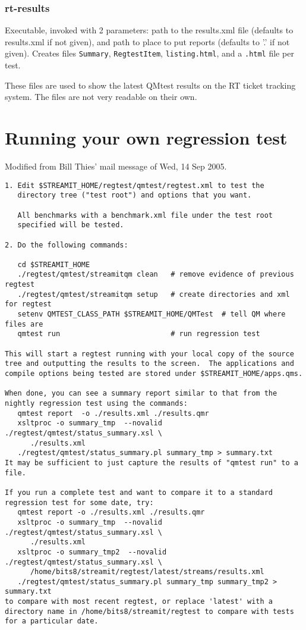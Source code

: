 \documentclass[11pt]{article}
\begin{document}
\subsubsection{rt-results}
Executable, invoked with 2 parameters: path to the results.xml file (defaults
to results.xml if not given), 
and path to place to put reports (defaults to '.' if not given).
Creates files 
{\tt Summary}, 
{\tt RegtestItem}, 
{\tt listing.html},
and a {\tt .html} file per test.

These files are used to show the latest QMtest results on the 
RT ticket tracking system. 
 The files are not very readable on their own.


\section{Running your own regression test}

Modified from Bill Thies' mail message of  Wed, 14 Sep 2005.
\begin{verbatim}
1. Edit $STREAMIT_HOME/regtest/qmtest/regtest.xml to test the
   directory tree ("test root") and options that you want.

   All benchmarks with a benchmark.xml file under the test root
   specified will be tested.

2. Do the following commands:

   cd $STREAMIT_HOME
   ./regtest/qmtest/streamitqm clean   # remove evidence of previous regtest
   ./regtest/qmtest/streamitqm setup   # create directories and xml for regtest
   setenv QMTEST_CLASS_PATH $STREAMIT_HOME/QMTest  # tell QM where files are
   qmtest run                          # run regression test

This will start a regtest running with your local copy of the source
tree and outputting the results to the screen.  The applications and
compile options being tested are stored under $STREAMIT_HOME/apps.qms.

When done, you can see a summary report similar to that from the
nightly regression test using the commands:
   qmtest report  -o ./results.xml ./results.qmr 
   xsltproc -o summary_tmp  --novalid ./regtest/qmtest/status_summary.xsl \
      ./results.xml
   ./regtest/qmtest/status_summary.pl summary_tmp > summary.txt
It may be sufficient to just capture the results of "qmtest run" to a file.

If you run a complete test and want to compare it to a standard
regression test for some date, try:
   qmtest report -o ./results.xml ./results.qmr 
   xsltproc -o summary_tmp  --novalid ./regtest/qmtest/status_summary.xsl \
      ./results.xml
   xsltproc -o summary_tmp2  --novalid ./regtest/qmtest/status_summary.xsl \
      /home/bits8/streamit/regtest/latest/streams/results.xml
   ./regtest/qmtest/status_summary.pl summary_tmp summary_tmp2 > summary.txt
to compare with most recent regtest, or replace 'latest' with a
directory name in /home/bits8/streamit/regtest to compare with tests
for a particular date.
\end{verbatim}
\end{document}

